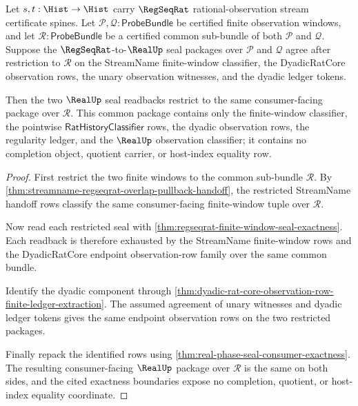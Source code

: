 \begin{theorem}
\label{thm:regseqrat-finite-window-seal-overlap-compatibility}
Let $s,t:\Hist\to\Hist$ carry $\RegSeqRat$ rational-observation stream
certificate spines. Let $\mathcal P,\mathcal Q:\mathsf{ProbeBundle}$ be
certified finite observation windows, and let
$\mathcal R:\mathsf{ProbeBundle}$ be a certified common sub-bundle of both
$\mathcal P$ and $\mathcal Q$. Suppose the $\RegSeqRat$-to-$\RealUp$ seal
packages over $\mathcal P$ and $\mathcal Q$ agree after restriction to
$\mathcal R$ on the StreamName finite-window classifier, the DyadicRatCore
observation rows, the unary observation witnesses, and the dyadic ledger
tokens.

Then the two $\RealUp$ seal readbacks restrict to the same consumer-facing
package over $\mathcal R$. This common package contains only the finite-window
classifier, the pointwise $\mathsf{RatHistoryClassifier}$ rows, the dyadic
observation rows, the regularity ledger, and the $\RealUp$ observation
classifier; it contains no completion object, quotient carrier, or host-index
equality row.
\end{theorem}
\begin{proof}
First restrict the two finite windows to the common sub-bundle
$\mathcal R$. By
\autoref{thm:streamname-regseqrat-overlap-pullback-handoff}, the restricted
StreamName handoff rows classify the same consumer-facing finite-window tuple
over $\mathcal R$.

Now read each restricted seal with
\autoref{thm:regseqrat-finite-window-seal-exactness}. Each readback is
therefore exhausted by the StreamName finite-window rows and the DyadicRatCore
endpoint observation-row family over the same common bundle.

Identify the dyadic component through
\autoref{thm:dyadic-rat-core-observation-row-finite-ledger-extraction}. The
assumed agreement of unary witnesses and dyadic ledger tokens gives the same
endpoint observation rows on the two restricted packages.

Finally repack the identified rows using
\autoref{thm:real-phase-seal-consumer-exactness}. The resulting
consumer-facing $\RealUp$ package over $\mathcal R$ is the same on both sides,
and the cited exactness boundaries expose no completion, quotient, or
host-index equality coordinate.
\end{proof}

